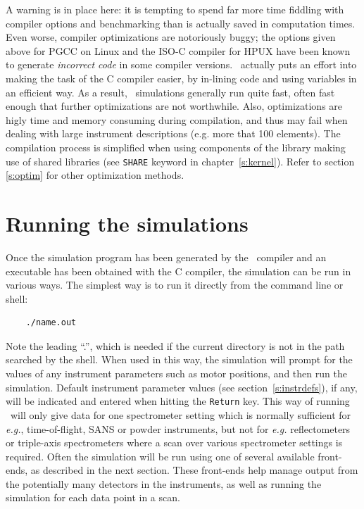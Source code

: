 A warning is in place here: it is tempting to spend far more time
fiddling with compiler options and benchmarking than is actually saved
in computation times. Even worse, compiler optimizations are notoriously
buggy; the options given above for PGCC on Linux and the ISO-C compiler
for HPUX have been known to generate \emph{incorrect code} in some
compiler versions. \MCS\ actually puts an effort into making the task of the C compiler
easier, by in-lining code and using variables in an efficient way. As a
result, \MCS\ simulations generally run quite fast, often fast enough
that further optimizations are not worthwhile. Also, optimizations are higly
time and memory consuming during compilation, and thus may fail when dealing
with large instrument descriptions (e.g. more that 100 elements). The compilation process is simplified when using components of the library making use of shared libraries (see \verb+SHARE+ keyword in chapter~\ref{s:kernel}). Refer to section \ref{s:optim} for other optimization methods.

\section{Running the simulations}
\label{s:run-sim}

Once the simulation program has been generated by the \MCS\ compiler
and an executable has been obtained with the C compiler, the simulation
can be run in various ways. The simplest way is to run it directly from the
command line or shell:
\begin{verbatim}
    ./name.out
\end{verbatim}
Note the leading ``.'', which is needed if the current directory is not in
the path searched by the shell. When used in this way, the simulation
will prompt for the values of any instrument parameters such as motor
positions, and then run the simulation. Default instrument parameter values (see section~\ref{s:instrdefs}), if any, will be indicated and entered when hitting the \verb+Return+ key.
This way of running \MCS\ will only give data for one spectrometer
setting which is normally sufficient for {\em e.g.}, time-of-flight,
SANS or powder instruments, but not for {\em e.g.} reflectometers or triple-axis spectrometers where a scan over
various spectrometer settings is required.
Often the simulation will be run using one of several
available front-ends, as described in the next section. These front-ends
help manage output from the potentially many detectors in the
instruments, as well as running the simulation for each data point in
a scan.


